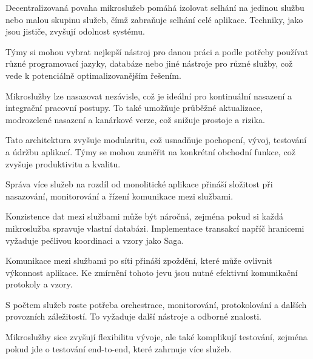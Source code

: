 
Decentralizovaná povaha mikroslužeb pomáhá izolovat selhání na jedinou službu nebo malou skupinu služeb, čímž zabraňuje selhání celé aplikace. Techniky, jako jsou jističe, zvyšují odolnost systému.


Týmy si mohou vybrat nejlepší nástroj pro danou práci a podle potřeby používat různé programovací jazyky, databáze nebo jiné nástroje pro různé služby, což vede k potenciálně optimalizovanějším řešením.


Mikroslužby lze nasazovat nezávisle, což je ideální pro kontinuální nasazení a integrační pracovní postupy. To také umožňuje průběžné aktualizace, modrozelené nasazení a kanárkové verze, což snižuje prostoje a rizika.


Tato architektura zvyšuje modularitu, což usnadňuje pochopení, vývoj, testování a údržbu aplikací. Týmy se mohou zaměřit na konkrétní obchodní funkce, což zvyšuje produktivitu a kvalitu.



Správa více služeb na rozdíl od monolitické aplikace přináší složitost při nasazování, monitorování a řízení komunikace mezi službami.


Konzistence dat mezi službami může být náročná, zejména pokud si každá mikroslužba spravuje vlastní databázi. Implementace transakcí napříč hranicemi vyžaduje pečlivou koordinaci a vzory jako Saga.


Komunikace mezi službami po síti přináší zpoždění, které může ovlivnit výkonnost aplikace. Ke zmírnění tohoto jevu jsou nutné efektivní komunikační protokoly a vzory.


S počtem služeb roste potřeba orchestrace, monitorování, protokolování a dalších provozních záležitostí. To vyžaduje další nástroje a odborné znalosti.


Mikroslužby sice zvyšují flexibilitu vývoje, ale také komplikují testování, zejména pokud jde o testování end-to-end, které zahrnuje více služeb.

